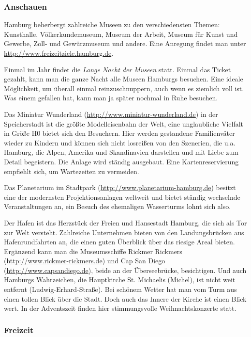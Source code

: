 \subsubsection{Anschauen}

Hamburg beherbergt zahlreiche Museen zu den verschiedensten Themen: Kunsthalle,
Völkerkundemuseum, Museum der Arbeit, Museum für Kunst und Gewerbe, Zoll- und
Gewürzmuseum und andere. Eine Anregung findet man unter
\url{http://www.freizeitziele.hamburg.de}.

\begin{advice}
Einmal im Jahr findet die \emph{Lange Nacht der Museen} statt. Einmal das
Ticket gezahlt, kann man die ganze Nacht alle Museen Hamburgs besuchen. Eine
ideale Möglichkeit, um überall einmal reinzuschnuppern, auch wenn es ziemlich
voll ist. Was einem gefallen hat, kann man ja später nochmal in Ruhe besuchen.
\end{advice}

Das Miniatur Wunderland (\url{http://www.miniatur-wunderland.de}) in der
Speicherstadt ist die größte Modelleisenbahn der Welt, eine unglaubliche
Vielfalt in Größe H0 bietet sich den Besuchern. Hier werden gestandene
Familienväter wieder zu Kindern und können sich nicht losreißen von den
Szenerien, die u.a. Hamburg, die Alpen, Amerika und Skandinavien darstellen und
mit Liebe zum Detail begeistern. Die Anlage wird ständig ausgebaut. Eine
Kartenreservierung empfiehlt sich, um Wartezeiten zu vermeiden.

Das Planetarium im Stadtpark (\url{http://www.planetarium-hamburg.de}) besitzt
eine der modernsten Projektionsanlagen weltweit und bietet ständig wechselnde
Veranstaltungen an, ein Besuch des ehemaligen Wasserturms lohnt sich also.

Der Hafen ist das Herzstück der Freien und Hansestadt Hamburg, die sich als Tor
zur Welt versteht. Zahlreiche Unternehmen bieten von den Landungsbrücken aus
Hafenrundfahrten an, die einen guten Überblick über das riesige Areal bieten.
Ergänzend kann man die Museumsschiffe Rickmer Rickmers
(\url{http://www.rickmer-rickmers.de}) und Cap San Diego
(\url{http://www.capsandiego.de}), beide an der Überseebrücke, besichtigen. Und
auch Hamburgs Wahrzeichen, die Hauptkirche St. Michaelis (Michel), ist nicht
weit entfernt (Ludwig-Erhard-Straße). Bei schönem Wetter hat man vom Turm aus
einen tollen Blick über die Stadt. Doch auch das Innere der Kirche ist einen
Blick wert. In der Adventszeit finden hier stimmungsvolle Weihnachtskonzerte
statt.

\subsubsection{Freizeit}

